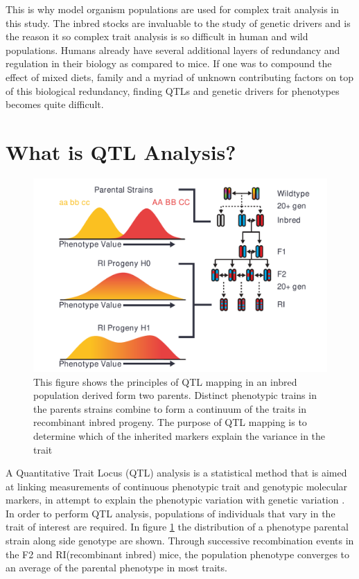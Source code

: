 \documentclass[a4paper,11pt,twoside]{book}
\begin{document}
	This is why model organism populations are used for complex trait analysis in this study. The inbred stocks are invaluable to the study of genetic drivers and is the reason it so complex trait analysis is so difficult in human and wild populations. Humans already have several additional layers of redundancy and regulation in their biology as compared to mice\citep{Kafri2006Thecircuits}. If one was to compound the effect of mixed diets, family and a myriad of unknown contributing factors on top of this biological redundancy, finding QTLs and genetic drivers for phenotypes becomes quite difficult. 
	
	
	\section{What is QTL Analysis?}
	
		\begin{figure}[ht!]
		\includegraphics[width=\linewidth]{QTL_Results/QTL_Introduction.pdf}
		\caption{This figure shows the principles of QTL mapping in an inbred population derived form two parents. Distinct phenotypic trains in the parents strains combine to form a continuum of the traits in recombinant inbred progeny. The purpose of QTL mapping is to determine which of the inherited markers explain the variance in the trait}
		\label{fig:QTL Explanation}
	\end{figure}
	
	
	A Quantitative Trait Locus (QTL) analysis is a statistical method that is aimed at linking measurements of continuous phenotypic trait and genotypic molecular markers, in attempt to explain the phenotypic variation with genetic variation \citep{Mackay2009TheProspects}. In order to perform QTL analysis, populations of individuals that vary in the trait of interest are required. In figure \ref{fig:QTL Explanation} the distribution of a phenotype parental strain along side genotype are shown. Through successive recombination events in the F2 and RI(recombinant inbred) mice, the population phenotype converges to an average of the parental phenotype in most traits. 
	
\end{document}

